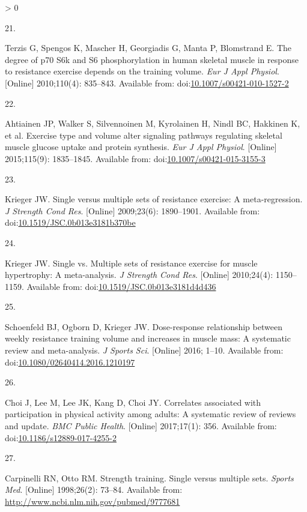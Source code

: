 \documentclass[twoside,10pt]{gihclass} %
\newlength{\cslhangindent}
\newlength{\csllabelwidth}
\newenvironment{CSLReferences}[3] %
 {%
  \setlength{\parindent}{0pt}
  \ifodd #1 \everypar{\setlength{\hangindent}{\cslhangindent}}\ignorespaces\fi
  \ifnum #2 > 0
  \setlength{\parskip}{#2\baselineskip}
  \fi
 }%
 {}
\newcommand{\CSLLeftMargin}[1]{\parbox[t]{\maxof{\widthof{#1}}{\csllabelwidth}}{#1}}
\newcommand{\CSLRightInline}[1]{\parbox[t]{\linewidth}{#1}}
\begin{document}
\begin{CSLReferences}{0}{0}
\leavevmode\hypertarget{ref-RN784}{}%
\CSLLeftMargin{21. }
\CSLRightInline{Terzis G, Spengos K, Mascher H, Georgiadis G, Manta P, Blomstrand E. The degree of p70 S6k and S6 phosphorylation in human skeletal muscle in response to resistance exercise depends on the training volume. \emph{Eur J Appl Physiol}. {[}Online{]} 2010;110(4): 835--843. Available from: doi:\href{https://doi.org/10.1007/s00421-010-1527-2}{10.1007/s00421-010-1527-2}}

\leavevmode\hypertarget{ref-RN1837}{}%
\CSLLeftMargin{22. }
\CSLRightInline{Ahtiainen JP, Walker S, Silvennoinen M, Kyrolainen H, Nindl BC, Hakkinen K, et al. Exercise type and volume alter signaling pathways regulating skeletal muscle glucose uptake and protein synthesis. \emph{Eur J Appl Physiol}. {[}Online{]} 2015;115(9): 1835--1845. Available from: doi:\href{https://doi.org/10.1007/s00421-015-3155-3}{10.1007/s00421-015-3155-3}}

\leavevmode\hypertarget{ref-RN793}{}%
\CSLLeftMargin{23. }
\CSLRightInline{Krieger JW. Single versus multiple sets of resistance exercise: A meta-regression. \emph{J Strength Cond Res}. {[}Online{]} 2009;23(6): 1890--1901. Available from: doi:\href{https://doi.org/10.1519/JSC.0b013e3181b370be}{10.1519/JSC.0b013e3181b370be}}

\leavevmode\hypertarget{ref-RN789}{}%
\CSLLeftMargin{24. }
\CSLRightInline{Krieger JW. Single vs. Multiple sets of resistance exercise for muscle hypertrophy: A meta-analysis. \emph{J Strength Cond Res}. {[}Online{]} 2010;24(4): 1150--1159. Available from: doi:\href{https://doi.org/10.1519/JSC.0b013e3181d4d436}{10.1519/JSC.0b013e3181d4d436}}

\leavevmode\hypertarget{ref-RN1767}{}%
\CSLLeftMargin{25. }
\CSLRightInline{Schoenfeld BJ, Ogborn D, Krieger JW. Dose-response relationship between weekly resistance training volume and increases in muscle mass: A systematic review and meta-analysis. \emph{J Sports Sci}. {[}Online{]} 2016; 1--10. Available from: doi:\href{https://doi.org/10.1080/02640414.2016.1210197}{10.1080/02640414.2016.1210197}}

\leavevmode\hypertarget{ref-RN2063}{}%
\CSLLeftMargin{26. }
\CSLRightInline{Choi J, Lee M, Lee JK, Kang D, Choi JY. Correlates associated with participation in physical activity among adults: A systematic review of reviews and update. \emph{BMC Public Health}. {[}Online{]} 2017;17(1): 356. Available from: doi:\href{https://doi.org/10.1186/s12889-017-4255-2}{10.1186/s12889-017-4255-2}}

\leavevmode\hypertarget{ref-RN794}{}%
\CSLLeftMargin{27. }
\CSLRightInline{Carpinelli RN, Otto RM. Strength training. Single versus multiple sets. \emph{Sports Med}. {[}Online{]} 1998;26(2): 73--84. Available from: \url{http://www.ncbi.nlm.nih.gov/pubmed/9777681}}


\end{CSLReferences}
\end{document}
